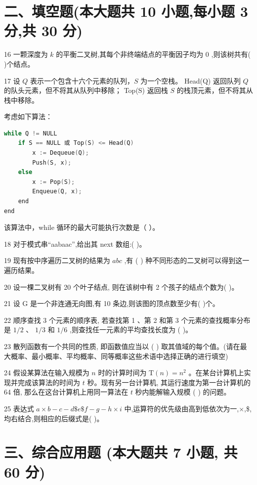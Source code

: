 \section*{二、填空题(本大题共 10 小题,每小题 3 分,共 30 分)}

16 一颗深度为 \(k\) 的平衡二叉树,其每个非终端结点的平衡因子均为 0 ,则该树共有(   )个结点。

17 设 \( Q \) 表示一个包含十六个元素的队列，\( S \) 为一个空栈。  
Head(Q) 返回队列 \( Q \) 的队头元素，但不将其从队列中移除；  
Top(S) 返回栈 \( S \) 的栈顶元素，但不将其从栈中移除。  

考虑如下算法：
\begin{lstlisting}[language=C, basicstyle=\ttfamily]
while Q != NULL
    if S == NULL 或 Top(S) <= Head(Q)
        x := Dequeue(Q);
        Push(S, x);
    else
        x := Pop(S);
        Enqueue(Q, x);
    end
end
\end{lstlisting}

该算法中，while 循环的最大可能执行次数是（   ）。

18 对于模式串“aabaac”,给出其 next 数组:(   )。

19 现有按中序遍历二叉树的结果为 \({abc}\) ,有 (   ) 种不同形态的二叉树可以得到这一遍历结果。

20 设一棵二叉树有 20 个叶子结点, 则在该树中有 2 个孩子的结点个数为(   )。

21 设 \(\mathrm{G}\) 是一个非连通无向图,有 10 条边,则该图的顶点数至少有(   )个。

22 顺序查找 3 个元素的顺序表, 若查找第 1 、第 2 和第 3 个元素的查找概率分布是 \(1/2\) 、 \(1/3\) 和 \(1/6\) ,则查找任一元素的平均查找长度为 (   )。

23 散列函数有一个共同的性质, 即函数值应当以 (   ) 取其值域的每个值。(请在最大概率、最小概率、平均概率、同等概率这些术语中选择正确的进行填空)

24 假设某算法在输入规模为 \(n\) 时的计算时间为 \(\mathrm{T}\left( n\right)  = {n}^{2}\) 。在某台计算机上实现并完成该算法的时间为 \(t\) 秒。现有另一台计算机, 其运行速度为第一台计算机的 64 倍, 那么在这台计算机上用同一算法在 \(t\) 秒内能解输入规模 (   ) 的问题。

25 表达式 \(a \times  b - c - d\$ e\$ f - g - h \times  i\) 中,运算符的优先级由高到低依次为一,×,\$,均右结合,则相应的后缀式是(   )。

\section*{三、综合应用题 (本大题共 7 小题, 共 60 分)}

